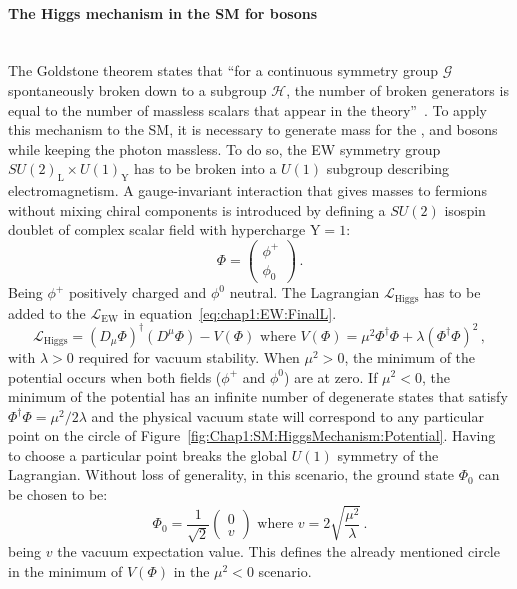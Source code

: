 \paragraph{The Higgs mechanism in the SM for bosons}\mbox{}\\
The Goldstone theorem  states that 
``for a continuous symmetry group $\mathcal{G}$ spontaneously broken down to a subgroup $\mathcal{H}$, the number of broken generators is equal to the number of massless scalars  that appear in the theory''~\cite{Goldstone:1962es}.
To apply this mechanism to the SM, it is necessary to generate mass for the \PWplus, \PWminus and \PZ bosons while keeping the photon massless. 
To do so, the EW symmetry group $SU(2)_\text{L} \times U(1)_\text{Y}$ has to be broken into a $U(1)$ subgroup describing electromagnetism. 
A gauge-invariant interaction that gives masses to fermions without mixing chiral components
is introduced by defining a $SU(2)$ isospin doublet of complex scalar field with hypercharge $\text{Y}=1$:
\begin{equation*}
	\Phi = \begin{pmatrix} \phi^+ \\ \phi_0 \end{pmatrix}\, .
\end{equation*}
Being $\phi^+$ positively charged and $\phi^0$ neutral. The Lagrangian $\mathcal{L}_{\text{Higgs}}$ has to be added to the $\mathcal{L}_{\text{EW}}$ in equation~\ref{eq:chap1:EW:FinalL}.
\begin{equation*}\label{eq:chap1:HiggsMechanism:HiggsLagrangianA}
	\mathcal{L}_{\text{Higgs}} = (D_{\mu} \Phi)^{\dagger}(D^{\mu} \Phi) - V(\Phi) \textrm{ where } V(\Phi) = \mu^{2}\Phi^{\dagger} \Phi + \lambda (\Phi^{\dagger} \Phi)^{2}\, ,
\end{equation*}
with $\lambda >0$ required for vacuum stability. When $\mu^{2}>0$, the minimum of the potential occurs when both fields ($\phi^+$ and $\phi^0$) are at zero. If $\mu^{2}<0$, the 
minimum of the potential has an infinite number of degenerate states that satisfy $\Phi^{\dagger} \Phi = \mu^{2}/2\lambda$ and the physical vacuum state will correspond 
to any particular point on the circle of Figure~\ref{fig:Chap1:SM:HiggsMechanism:Potential}.
Having to choose a particular point breaks the global $U(1)$ symmetry of the Lagrangian. Without loss of generality, in this scenario, the ground state $\Phi_{0}$ can be chosen to be:
\begin{equation*}
	\Phi_{0} = \frac{1}{\sqrt{2}}\begin{pmatrix} 0 \\ v \end{pmatrix} \textrm{ where } v = 2\sqrt{\frac{\mu^{2}}{\lambda}}\, .
\end{equation*}
being $v$ the vacuum expectation value. This defines the already mentioned circle in the minimum of $V(\Phi)$ in the $\mu^{2}<0$ scenario.

